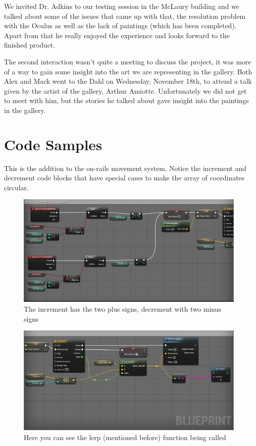 \documentclass[11pt]{book}
\begin{document}
We invited Dr. Adkins to our testing session in the McLaury building and we talked about some of the issues that came up with that, the resolution problem with the Oculus as well as the lack of paintings (which has been completed).  Apart from that he really enjoyed the experience and looks forward to the finished product.

The second interaction wasn't quite a meeting to discuss the project, it was more of a way to gain some insight into the art we are representing in the gallery.  Both Alex and Mack went to the Dahl on Wednesday, November 18th, to attend a talk given by the artist of the gallery, Arthur Amiotte.  Unfortunately we did not get to meet with him, but the stories he talked about gave insight into the paintings in the gallery.

\section*{Code Samples}

This is the addition to the on-rails movement system.  Notice the increment and decrement code blocks that have special cases to make the array of coordinates circular. 

\begin{figure}
\caption{The increment has the two plus signs, decrement with two minus signs}
\centering
\includegraphics[scale=0.75]{WayMove1.png}
\end{figure}

\begin{figure}
\caption{Here you can see the lerp (mentioned before) function being called}
\centering
\includegraphics[scale=0.75]{WayMove2.png}
\end{figure}
\end{document}
